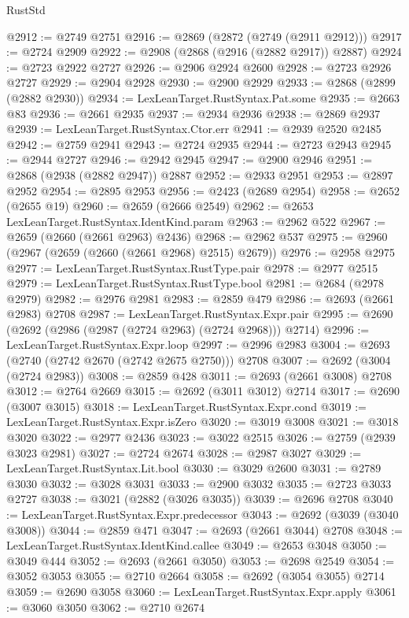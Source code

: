 \begin{lexlean}{RustStd}
\begin{coremodule}
@2912 := @2749 @2751
@2916 := @2869 (@2872 (@2749 (@2911 @2912)))
@2917 := @2724 @2909
@2922 := @2908 (@2868 (@2916 (@2882 @2917)) @2887)
@2924 := @2723 @2922 @2727
@2926 := @2906 @2924 @2600
@2928 := @2723 @2926 @2727
@2929 := @2904 @2928
@2930 := @2900 @2929
@2933 := @2868 (@2899 (@2882 @2930))
@2934 := LexLeanTarget.RustSyntax.Pat.some
@2935 := @2663 @83
@2936 := @2661 @2935
@2937 := @2934 @2936
@2938 := @2869 @2937
@2939 := LexLeanTarget.RustSyntax.Ctor.err
@2941 := @2939 @2520 @2485
@2942 := @2759 @2941
@2943 := @2724 @2935
@2944 := @2723 @2943
@2945 := @2944 @2727
@2946 := @2942 @2945
@2947 := @2900 @2946
@2951 := @2868 (@2938 (@2882 @2947)) @2887
@2952 := @2933 @2951
@2953 := @2897 @2952
@2954 := @2895 @2953
@2956 := @2423 (@2689 @2954)
@2958 := @2652 (@2655 @19)
@2960 := @2659 (@2666 @2549)
@2962 := @2653 LexLeanTarget.RustSyntax.IdentKind.param
@2963 := @2962 @522
@2967 := @2659 (@2660 (@2661 @2963) @2436)
@2968 := @2962 @537
@2975 := @2960 (@2967 (@2659 (@2660 (@2661 @2968) @2515) @2679))
@2976 := @2958 @2975
@2977 := LexLeanTarget.RustSyntax.RustType.pair
@2978 := @2977 @2515
@2979 := LexLeanTarget.RustSyntax.RustType.bool
@2981 := @2684 (@2978 @2979)
@2982 := @2976 @2981
@2983 := @2859 @479
@2986 := @2693 (@2661 @2983) @2708
@2987 := LexLeanTarget.RustSyntax.Expr.pair
@2995 := @2690 (@2692 (@2986 (@2987 (@2724 @2963) (@2724 @2968))) @2714)
@2996 := LexLeanTarget.RustSyntax.Expr.loop
@2997 := @2996 @2983
@3004 := @2693 (@2740 (@2742 @2670 (@2742 @2675 @2750))) @2708
@3007 := @2692 (@3004 (@2724 @2983))
@3008 := @2859 @428
@3011 := @2693 (@2661 @3008) @2708
@3012 := @2764 @2669
@3015 := @2692 (@3011 @3012) @2714
@3017 := @2690 (@3007 @3015)
@3018 := LexLeanTarget.RustSyntax.Expr.cond
@3019 := LexLeanTarget.RustSyntax.Expr.isZero
@3020 := @3019 @3008
@3021 := @3018 @3020
@3022 := @2977 @2436
@3023 := @3022 @2515
@3026 := @2759 (@2939 @3023 @2981)
@3027 := @2724 @2674
@3028 := @2987 @3027
@3029 := LexLeanTarget.RustSyntax.Lit.bool
@3030 := @3029 @2600
@3031 := @2789 @3030
@3032 := @3028 @3031
@3033 := @2900 @3032
@3035 := @2723 @3033 @2727
@3038 := @3021 (@2882 (@3026 @3035))
@3039 := @2696 @2708
@3040 := LexLeanTarget.RustSyntax.Expr.predecessor
@3043 := @2692 (@3039 (@3040 @3008))
@3044 := @2859 @471
@3047 := @2693 (@2661 @3044) @2708
@3048 := LexLeanTarget.RustSyntax.IdentKind.callee
@3049 := @2653 @3048
@3050 := @3049 @444
@3052 := @2693 (@2661 @3050)
@3053 := @2698 @2549
@3054 := @3052 @3053
@3055 := @2710 @2664
@3058 := @2692 (@3054 @3055) @2714
@3059 := @2690 @3058
@3060 := LexLeanTarget.RustSyntax.Expr.apply
@3061 := @3060 @3050
@3062 := @2710 @2674

\end{coremodule}
\end{lexlean}
